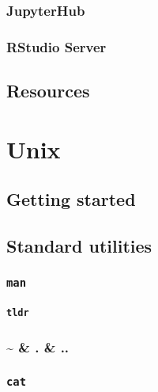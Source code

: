 \documentclass[
]{book}
\begin{document}
\hypertarget{jupyterhub}{%
\subsection{JupyterHub}\label{jupyterhub}}

\hypertarget{rstudio-server}{%
\subsection{RStudio Server}\label{rstudio-server}}

\hypertarget{scholar-resources}{%
\section{Resources}\label{scholar-resources}}

\hypertarget{unix}{%
\chapter{Unix}\label{unix}}

\hypertarget{unix-getting-started}{%
\section{Getting started}\label{unix-getting-started}}

\hypertarget{unix-utilities}{%
\section{Standard utilities}\label{unix-utilities}}

\hypertarget{man}{%
\subsection{\texorpdfstring{\texttt{man}}{man}}\label{man}}

\hypertarget{tldr}{%
\subsubsection{\texorpdfstring{\texttt{tldr}}{tldr}}\label{tldr}}

\hypertarget{dots}{%
\subsection{\textasciitilde{} \& . \& ..}\label{dots}}

\hypertarget{cat}{%
\subsection{\texorpdfstring{\texttt{cat}}{cat}}\label{cat}}
\end{document}
